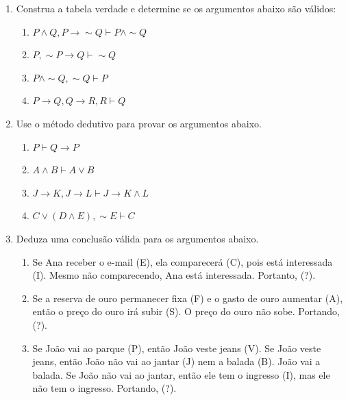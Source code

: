 \documentclass[a4paper,5pt]{amsbook}
\newcommand{\ra}{\rightarrow}
\renewcommand{\lnot}{\sim}
\newcommand{\larg}{\vdash}
\begin{document}
\vspace{1cm}
\begin{enumerate}
    \vspace{0.5cm}
    \item Construa a tabela verdade e determine se os argumentos abaixo s\~ao v\'alidos:
        \begin{enumerate}
            \item $P \land Q, P \ra \lnot Q \larg P \land \lnot Q$
            \item $P, \lnot P \ra Q \larg \lnot Q$
            \item $P \land \lnot Q, \lnot Q \larg P$
            \item $P \ra Q, Q \ra R, R \larg Q$
        \end{enumerate}
    
    \vspace{0.5cm}
    \item Use o m\'etodo dedutivo para provar os argumentos abaixo.
        \begin{enumerate}
            \item $P \larg Q \ra P$
            \item $A \land B \larg A \lor B$
            \item $J \ra K, J \ra L \larg J \ra K \land L$
            \item $C \lor (D \land E), \lnot E \larg C$
        \end{enumerate}
    
    \vspace{0.5cm}
    \item Deduza uma conclus\~ao v\'alida para os argumentos abaixo.
        \begin{enumerate}
            \item Se Ana receber o e-mail (E), ela comparecer\'a (C), pois est\'a
            interessada (I).  Mesmo n\~ao comparecendo, Ana est\'a interessada.
            Portanto, (?).
            \item Se a reserva de ouro permanecer fixa (F) e o gasto de ouro
            aumentar (A), ent\~ao o pre\c{c}o do ouro ir\'a subir (S). O pre\c{c}o do ouro n\~ao
            sobe. Portando, (?).
            \item Se Jo\~ao vai ao parque (P), ent\~ao Jo\~ao veste jeans (V). Se Jo\~ao
            veste jeans, ent\~ao Jo\~ao n\~ao vai ao jantar (J) nem a balada (B). Jo\~ao
            vai a balada.  Se Jo\~ao n\~ao vai ao jantar, ent\~ao ele tem o ingresso (I),
            mas ele n\~ao tem o ingresso. Portando, (?).
        \end{enumerate}
\end{enumerate}
\end{document}
